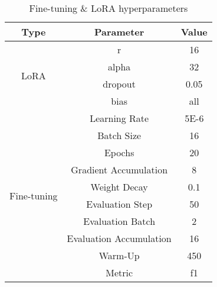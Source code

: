 \begin{table}[H]
	\centering
	\caption{Fine-tuning \& LoRA hyperparameters}
	{\small
	\begin{tabular}{||c | c | c||} 
		\hline
		\textbf{Type} & \textbf{Parameter} & \textbf{Value} \\
		\hline
		\multirow{4}{4.75em}{LoRA} & r & 16  \\ \cline{2-3}
		& alpha & 32  \\ \cline{2-3}
		& dropout & 0.05 \\ \cline{2-3}
		& bias & all \\
		\hline 
		\multirow{10}{4.75em}{Fine-tuning} & Learning Rate & 5E-6\\ \cline{2-3}
		& Batch Size & 16 \\ \cline{2-3}
		& Epochs & 20 \\ \cline{2-3}
		& Gradient Accumulation & 8 \\ \cline{2-3}
		& Weight Decay & 0.1 \\ \cline{2-3}
		& Evaluation Step & 50 \\ \cline{2-3}
		& Evaluation Batch & 2 \\ \cline{2-3}
		& Evaluation Accumulation & 16 \\ \cline{2-3}
		& Warm-Up & 450 \\ \cline{2-3}
		& Metric & f1 \\ \cline{2-3}
		\hline
	\end{tabular}
	}
	\label{table:hyperparameters}
\end{table}
%
%
